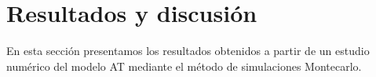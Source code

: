 \section{Resultados y discusión}
\label{sec:results}
En esta sección presentamos los resultados obtenidos a partir de un estudio numérico del modelo AT mediante el método de simulaciones Montecarlo.
